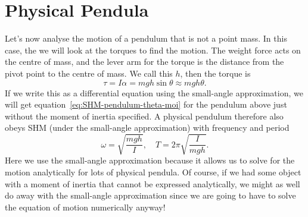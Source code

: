\documentclass[../classical_mechanics.tex]{subfiles}
\begin{document}
    \section{Physical Pendula}\label{sec:physical-pendula}
        Let's now analyse the motion of a pendulum that is not a point mass.
        In this case, the we will look at the torques to find the motion.
        The weight force acts on the centre of mass, and the lever arm for the torque is the distance from the pivot point to the centre of mass.
        We call this $h$, then the torque is
        \begin{equation}
            \tau=I\alpha=mgh\sin\theta\approx mgh\theta.
        \end{equation}
        If we write this as a differential equation using the small-angle approximation, we will get equation~\ref{eq:SHM-pendulum-theta-moi} for the pendulum above just without the moment of inertia specified.
        A physical pendulum therefore also obeys SHM (under the small-angle approximation) with frequency and period
        \begin{equation}\label{eq:SHM-physical-pendulum-frequency}
            \omega=\sqrt{\frac{mgh}{I}},\quad T=2\pi\sqrt{\frac{I}{mgh}}.
        \end{equation}
        Here we use the small-angle approximation because it allows us to solve for the motion analytically for lots of physical pendula.
        Of course, if we had some object with a moment of inertia that cannot be expressed analytically, we might as well do away with the small-angle approximation since we are going to have to solve the equation of motion numerically anyway!
\end{document}
